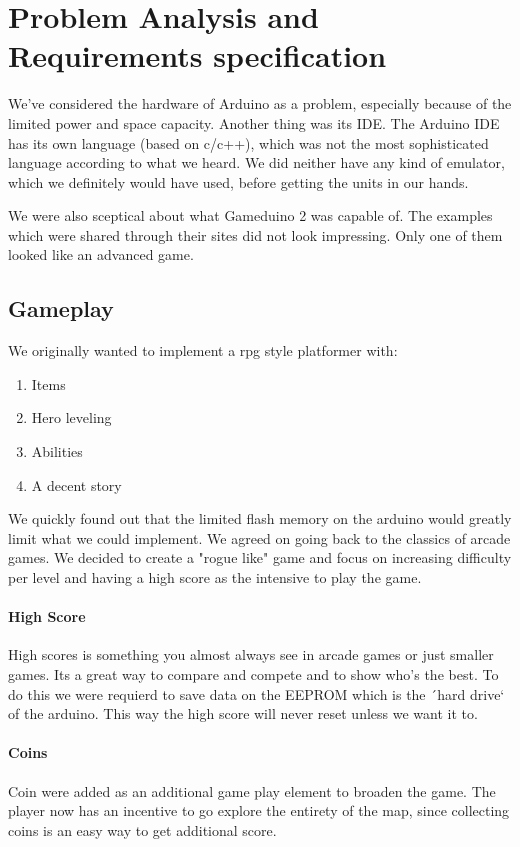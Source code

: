 \chapter{Problem Analysis and Requirements specification}

We've considered the hardware of Arduino as a problem, especially because of the limited power and space capacity. Another thing was its IDE. The Arduino IDE has its own language (based on c/c++), which was not the most
sophisticated language according to what we heard. We did neither have any kind of emulator, which we definitely would have used, before getting the units in our hands.

We were also sceptical about what Gameduino 2 was capable of. The examples
which were shared through their sites did not look impressing. Only one of them
looked like an advanced game.

\section{Gameplay}%
We originally wanted to implement a rpg style platformer with:
\begin{enumerate}
\item Items
\item Hero leveling
\item Abilities
\item A decent story
\end{enumerate}
We quickly found out that the limited flash memory on the arduino would greatly limit what we could implement. We agreed on going back to the classics of arcade games. We decided to create a "rogue like" game and focus on increasing difficulty per level and having a high score as the intensive to play the game.

\subsubsection*{High Score}
High scores is something you almost always see in arcade games or just smaller games. Its a great way to compare and compete and to show who's the best.
To do this we were requierd to save data on the EEPROM which is the ´hard drive` of the arduino. This way the high score will never reset unless we want it to.

\subsubsection*{Coins}
Coin were added as an additional game play element to broaden the game. The player now has an incentive to go explore the entirety of the map, since collecting coins is an easy way to get additional score.
